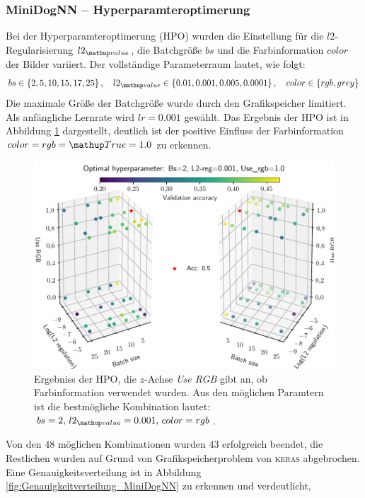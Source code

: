\subsubsection{MiniDogNN -- Hyperparamteroptimerung}
Bei der Hyperparamteroptimerung (HPO) wurden die Einstellung für die $l2$-Regularisierung $l2\ua{value}$,
die Batchgröße $bs$ und die Farbinformation $color$ der Bilder variiert. Der vollständige
Parameterraum lautet, wie folgt:
\begin{equation}
  \label{eq:Parameterraum_MiniDogNN}
  bs\in\left\{2, 5, 10, 15, 17, 25\right\}, \quad l2\ua{value}\in\left\{0.01, 0.001, 0.005, 0.0001\right\}, \quad color\in\left\{rgb, grey\right\}
\end{equation}
Die maximale Größe der Batchgröße wurde durch den Grafikspeicher limitiert.
Als anfängliche Lernrate wird $lr=0.001$ gewählt.
Das Ergebnis der HPO ist in Abbildung \ref{fig:Hyperraum_MiniDogNN} dargestellt,
deutlich ist der positive Einfluss der Farbinformation $color=rgb=\map{True}=1.0$
zu erkennen.
\begin{figure}
\centering
\includegraphics[width=\the\textwidth]{../../final_data/MiniNN_n5/hyper_raum.pdf}
\caption{Ergebniss der HPO, die $z$-Achse \emph{Use RGB} gibt an, ob Farbinformation
          verwendet wurden. Aus den möglichen Paramtern ist die bestmögliche Kombination
         lautet: $bs=2, \, l2\ua{value}=0.001, \, color=rgb$.}
\label{fig:Hyperraum_MiniDogNN}
\end{figure}
Von den $48$ möglichen Kombinationen wurden $43$ erfolgreich beendet, die Restlichen
wurden auf Grund von Grafikspeicherproblem von \textsc{keras} abgebrochen. Eine
Genauigkeitsverteilung ist in Abbildung \ref{fig:Genauigkeitverteilung_MiniDogNN} zu erkennen und verdeutlicht,
